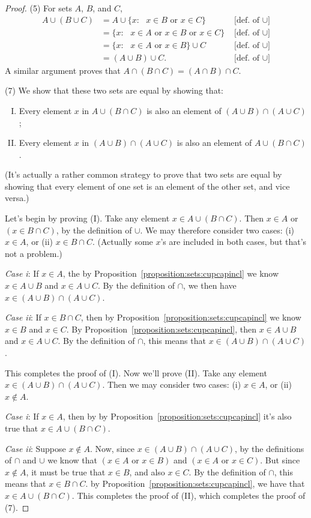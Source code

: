 \begin{proof}
\noindent 
(5)
For sets $A$, $B$, and $C$,
\begin{align*}
A \cup (B \cup C)
& =
A \cup \{ x : \mbox{ $x \in B$ or $x \in C$} \}   &\text{ [def. of } \cup]  \\
& =
\{ x : \mbox{ $x \in A$ or $x \in B$ or $x \in C$} \}    &\text{ [def. of } \cup]  \\
& =
\{ x : \mbox{ $x \in A$ or $x \in B$} \} \cup C    &\text{ [def. of } \cup]  \\
& =
(A \cup B) \cup C.    &\text{ [def. of } \cup] 
\end{align*}
A  similar argument proves that  $A \cap (B \cap C) = (A \cap B) \cap
C$. 

\noindent 
(7)
We show that these two sets are equal by showing that:
\begin{enumerate}[(I)]
\item
Every element $x$ in $A \cup (B \cap C)$ is also an element of $(A \cup B) \cap (A \cup C)$;
\item
Every element $x$ in $(A \cup B) \cap (A \cup C)$ is also an element of $A \cup (B \cap C)$.
\end{enumerate}
(It's actually a rather common strategy to prove that two sets are equal by showing that every element of one set is an element of the other set, and vice versa.)

Let's begin by proving (I). Take any element $x \in A \cup (B \cap C)$.  Then
$x \in A$  or $(x \in B \cap C)$, by the definition of $\cup$. We may therefore consider two cases: (i) $x \in A$, or (ii) $x \in B \cap C$.  (Actually some $x$'s are included in both cases, but that's not a problem.)

\noindent
\emph{Case i}:  If $x \in A$, the by Proposition~\ref{proposition:sets:cupcapincl} we know $x \in A \cup B$ and $x \in A \cup C$. By the definition of $\cap$, we then have   $x \in (A \cup B) \cap (A \cup C)$.

\noindent
\emph{Case ii}:  If $x \in  B  \cap C$, then by Proposition~\ref{proposition:sets:cupcapincl} we know $x \in  B$ and $x \in  C$. 
By Proposition~\ref{proposition:sets:cupcapincl},  then $x \in A \cup  B$ and $x \in A  \cup  C$.  By the definition of $\cap$, this means that $x \in (A \cup  B) \cap (A  \cup  C)$.  

This completes the proof of (I). Now we'll  prove (II). Take any element $x \in (A \cup B) \cap (A \cup C)$.  Then we may consider two cases: 
(i) $x \in A$, or (ii) $x \not\in A$.

\noindent
\emph{Case i}:  If $x \in A$, then by by Proposition~\ref{proposition:sets:cupcapincl} it's also true that 
$x \in A \cup (B \cap C)$.  

\noindent
\emph{Case ii}:  Suppose $x \not\in  A$. Now, since $x \in (A \cup B) \cap (A \cup C)$, by the definitions of $\cap$ and $\cup$ we know that $(x \in A \text{ or } x \in B)$ and $(x \in A \text{ or } x \in C)$. But since  $x \not\in  A$, it must be true that $x\in B$, and also $x\in C$. By the definition of $\cap$, this means that $x\in B \cap C$. by Proposition~\ref{proposition:sets:cupcapincl}, we have that  $x \in A \cup (B \cap C)$. This completes the proof of (II), which completes the proof of (7).
\end{proof}

